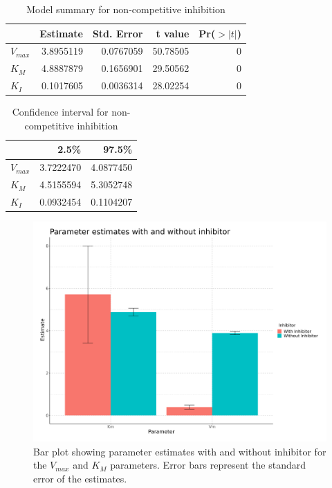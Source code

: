 \documentclass{article}
\begin{document}
\begin{table}[H]

    \caption{Model summary for non-competitive inhibition}
    \centering
    \begin{tabular}[t]{l|r|r|r|r}
        \hline
                  & Estimate  & Std. Error & t value  & Pr($>|t|$) \\
        \hline
        $V_{max}$ & 3.8955119 & 0.0767059  & 50.78505 & 0          \\
        \hline
        $K_{M}$   & 4.8887879 & 0.1656901  & 29.50562 & 0          \\
        \hline
        $K_{I}$   & 0.1017605 & 0.0036314  & 28.02254 & 0          \\
        \hline
    \end{tabular}
\end{table}

\begin{table}[H]

    \caption{Confidence interval for non-competitive inhibition}
    \centering
    \begin{tabular}[t]{l|r|r}
        \hline
                  & 2.5\%     & 97.5\%    \\
        \hline
        $V_{max}$ & 3.7222470 & 4.0877450 \\
        \hline
        $K_{M}$   & 4.5155594 & 5.3052748 \\
        \hline
        $K_{I}$   & 0.0932454 & 0.1104207 \\
        \hline
    \end{tabular}
\end{table}

\begin{figure}[H]
    \centering
    \includegraphics[width=1.2\textwidth, height=0.5\textheight]{plots/enzyme_hw_plot3.png}
    \caption{Bar plot showing parameter estimates with and without inhibitor for the $V_{max}$ and $K_M$ parameters.
        Error bars represent the standard error of the estimates.}
    \label{fig:Bar plot $V_{max}$ $K_{M}$}
\end{figure}
\end{document}
